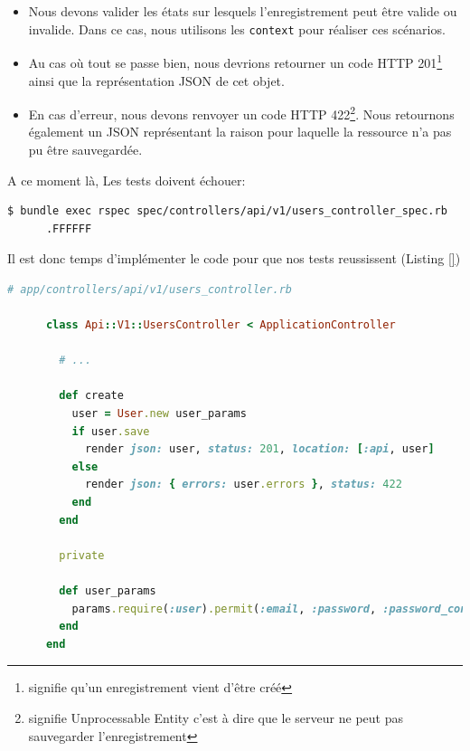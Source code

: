 \documentclass[]{report}
\begin{document}
      \begin{itemize}
        \item Nous devons valider les états sur lesquels l'enregistrement peut être valide ou invalide. Dans ce cas, nous utilisons les \verb|context| pour réaliser ces scénarios.
        \item  Au cas où tout se passe bien, nous devrions retourner un code HTTP 201\footnote{signifie qu'un enregistrement vient d'être créé} ainsi que la représentation JSON de cet objet.
        \item En cas d'erreur, nous devons renvoyer un code HTTP 422\footnote{signifie Unprocessable Entity c'est à dire que le serveur ne peut pas sauvegarder l'enregistrement}. Nous retournons également un JSON représentant la raison pour laquelle la ressource n'a pas pu être sauvegardée.
      \end{itemize}

      A ce moment là, Les tests doivent échouer:

      \begin{scriptsize}
      \begin{lstlisting}[language=bash]
      $ bundle exec rspec spec/controllers/api/v1/users_controller_spec.rb
      .FFFFFF
      \end{lstlisting}
      \end{scriptsize}

      Il est donc temps d'implémenter le code pour que nos tests reussissent (Listing \ref{})

      \begin{scriptsize}
      \begin{lstlisting}[language=ruby, caption={Implémentation du contrôlleur utilisateurs afin que les tests de création passent}]
      # app/controllers/api/v1/users_controller.rb

      class Api::V1::UsersController < ApplicationController

        # ...

        def create
          user = User.new user_params
          if user.save
            render json: user, status: 201, location: [:api, user]
          else
            render json: { errors: user.errors }, status: 422
          end
        end

        private

        def user_params
          params.require(:user).permit(:email, :password, :password_confirmation)
        end
      end
      \end{lstlisting}
      \end{scriptsize}
\end{document}
